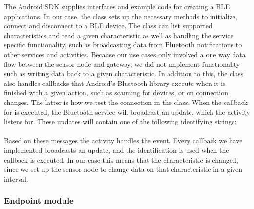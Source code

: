 \noindent
The Android SDK supplies interfaces and example code for creating a BLE applications. In our case, the  class sets up the necessary methods to initialize, connect and disconnect to a BLE device. The class can list supported characteristics and read a given characteristic as well as handling the service specific functionality, such as broadcasting data from Bluetooth notifications to other services and activities. Because our use cases only involved a one way data flow between the sensor node and gateway, we did not implement functionality such as writing data back to a given characteristic. In addition to this, the class also handles callbacks that Android's Bluetooth library execute when it is finished with a given action, such as scanning for devices, or on connection changes. The latter is how we test the connection in the  class. When the callback for  is executed, the Bluetooth service will broadcast an update, which the  activity listens for. These updates will contain one of the following identifying strings:\\
\newline
\noindent{}
\\
\noindent
Based on these messages the  activity handles the event. Every callback we have implemented broadcasts an update, and the  identification is used when the callback  is executed. In our case this means that the  characteristic is changed, since we set up the sensor node to change data on that characteristic in a given interval.


\subsubsection{Endpoint module} %
\label{ssub:endpoint_module}

